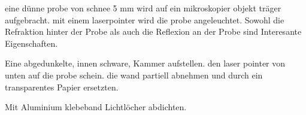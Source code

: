 eine dünne probe von schnee 5 mm wird auf ein mikroskopier objekt träger aufgebracht. mit einem laserpointer wird die probe angeleuchtet. Sowohl die Refraktion hinter der Probe als auch die Reflexion an der Probe sind Interesante Eigenschaften.

Eine abgedunkelte, innen schware, Kammer aufstellen. den laser pointer von unten auf die probe schein. die wand partiell abnehmen und durch ein transparentes Papier ersetzten.

Mit Aluminium klebeband Lichtlöcher abdichten.
